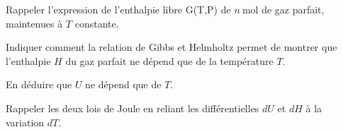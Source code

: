 \begin{exercise}
\begin{questions}
\question Rappeler l'expression de l'enthalpie libre G(T,P) de $n ~ \si{\mole}$ de gaz parfait, maintenues à $T$ constante.

\question Indiquer comment la relation de Gibbs et Helmholtz permet de montrer que l’enthalpie $H$ du gaz parfait ne dépend que de la température $T$.

\question  En déduire que $U$ ne dépend que de $T$.

\question Rappeler les deux lois de Joule en reliant les différentielles $dU$ et $dH$ à la variation $dT$.
\end{questions}

\end{exercise}